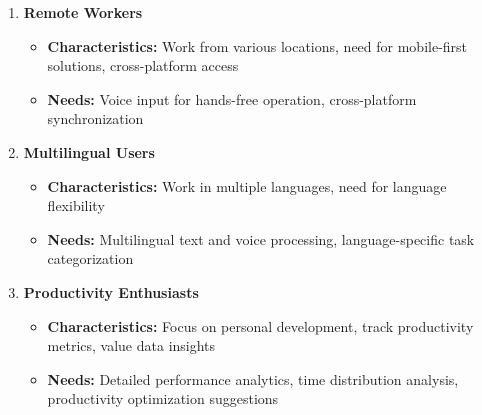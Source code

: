 \documentclass[12pt,a4paper]{article}
\begin{document}
\begin{enumerate}
    \item \textbf{Remote Workers}
    \begin{itemize}
        \item \textbf{Characteristics:} Work from various locations, need for mobile-first solutions, cross-platform access
        \item \textbf{Needs:} Voice input for hands-free operation, cross-platform synchronization
    \end{itemize}
    
    \item \textbf{Multilingual Users}
    \begin{itemize}
        \item \textbf{Characteristics:} Work in multiple languages, need for language flexibility
        \item \textbf{Needs:} Multilingual text and voice processing, language-specific task categorization
    \end{itemize}
    
    \item \textbf{Productivity Enthusiasts}
    \begin{itemize}
        \item \textbf{Characteristics:} Focus on personal development, track productivity metrics, value data insights
        \item \textbf{Needs:} Detailed performance analytics, time distribution analysis, productivity optimization suggestions
    \end{itemize}
\end{enumerate}
\end{document}
